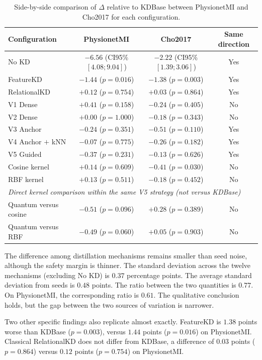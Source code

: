 \begin{table}[!htbp]
\centering
\caption{Side-by-side comparison of $\Delta$ relative to KDBase
between PhysionetMI and Cho2017 for each configuration.}
\label{tab:sosanh2dataset}
\small
\begin{tabular}{lccc}
\toprule
\textbf{Configuration} & \textbf{PhysionetMI} & \textbf{Cho2017} & \textbf{Same direction} \\
\midrule
No KD & $-6.56$ (CI95\% $[4.08;9.04]$) & $-2.22$ (CI95\% $[1.39;3.06]$) & Yes \\
FeatureKD & $-1.44$ ($p=0.016$) & $-1.38$ ($p=0.003$) & Yes \\
RelationalKD & $+0.12$ ($p=0.754$) & $+0.03$ ($p=0.864$) & Yes \\
V1 Dense & $+0.41$ ($p=0.158$) & $-0.24$ ($p=0.405$) & No \\
V2 Dense & $+0.00$ ($p=1.000$) & $-0.18$ ($p=0.343$) & No \\
V3 Anchor & $-0.24$ ($p=0.351$) & $-0.51$ ($p=0.110$) & Yes \\
V4 Anchor $+$ kNN & $-0.07$ ($p=0.775$) & $-0.26$ ($p=0.182$) & Yes \\
V5 Guided & $-0.37$ ($p=0.231$) & $-0.13$ ($p=0.626$) & Yes \\
Cosine kernel & $+0.14$ ($p=0.609$) & $-0.41$ ($p=0.030$) & No \\
RBF kernel & $+0.13$ ($p=0.511$) & $-0.18$ ($p=0.452$) & No \\
\midrule
\multicolumn{4}{l}{\textit{Direct kernel comparison within the same V5 strategy (not versus KDBase)}} \\
Quantum versus cosine & $-0.51$ ($p=0.096$) & $+0.28$ ($p=0.389$) & No \\
Quantum versus RBF & $-0.49$ ($p=0.060$) & $+0.05$ ($p=0.903$) & No \\
\bottomrule
\end{tabular}
\end{table}
\FloatBarrier

The difference among distillation mechanisms remains smaller than
seed noise, although the safety margin is thinner. The standard
deviation across the twelve mechanisms (excluding No KD) is $0.37$
percentage points. The average standard deviation from seeds is
$0.48$ points. The ratio between the two quantities is $0.77$. On
PhysionetMI, the corresponding ratio is $0.61$. The qualitative
conclusion holds, but the gap between the two sources of variation
is narrower.

Two other specific findings also replicate almost exactly. FeatureKD
is $1.38$ points worse than KDBase ($p = 0.003$), versus $1.44$
points ($p = 0.016$) on PhysionetMI. Classical RelationalKD does not
differ from KDBase, a difference of $0.03$ points ($p = 0.864$)
versus $0.12$ points ($p = 0.754$) on PhysionetMI.

